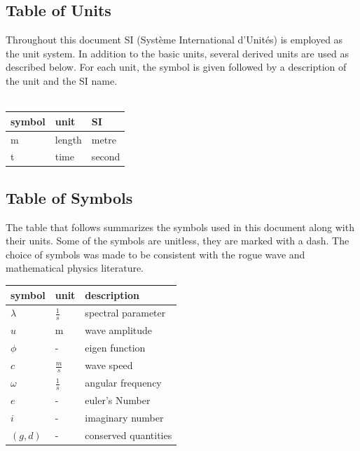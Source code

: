 \documentclass[12pt]{article}
\begin{document}
\subsection{Table of Units}

Throughout this document SI (Syst\`{e}me International d'Unit\'{e}s) is employed
as the unit system.  In addition to the basic units, several derived units are
used as described below.  For each unit, the symbol is given followed by a
description of the unit and the SI name. \\

~\newline

\renewcommand{\arraystretch}{1.2}
  \noindent \begin{tabular}{l l l} 
    \toprule		
    \textbf{symbol} & \textbf{unit} & \textbf{SI}\\
    \midrule 
    \si{\metre} & length & metre\\
    t & time & second\\
    \bottomrule
  \end{tabular}


\subsection{Table of Symbols}

The table that follows summarizes the symbols used in this document along with
their units. Some of the symbols are unitless, 
they are marked with a dash. The choice of symbols was made to be consistent 
with the rogue 
wave and mathematical physics literature.  

\renewcommand{\arraystretch}{1.2}
\noindent \begin{longtable*}{l l p{12cm}} \toprule
\textbf{symbol} & \textbf{unit} & \textbf{description}\\
\midrule 
$\lambda$ & $\frac{1}{s}$ & spectral parameter
\\
$u$ & m & wave amplitude 
\\  
$\phi$ & - & eigen function
\\ 
$c$ & $\frac{m}{s}$ & wave speed 
\\
$\omega$ & $\frac{1}{s}$ & angular frequency 
\\ 
$e$ & - & euler's Number \\ 
$i$ & - & imaginary number\\ 
$(g,d)$ & - & conserved quantities\\
  
\bottomrule
\end{longtable*}
\end{document}
